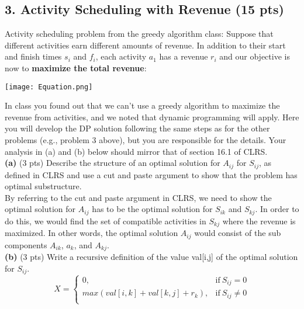 \documentclass[12pt]{article}
\begin{document}
\subsection*{3. Activity Scheduling with Revenue (15 pts)} 
\linebreak
Activity scheduling problem from the greedy algorithm class: Suppose that different activities earn different amounts of revenue. In addition to their start and finish times $s_i$ and $f_i$, each activity $a_1$ has a revenue $r_i$ and our objective is now to \textbf{maximize the total revenue}: \\
\linebreak
\begin{center}
\texttt{[image: Equation.png]} \\
\end{center}
In class you found out that we can't use a greedy algorithm to maximize the revenue from activities, and we noted that dynamic programming will apply. Here you will develop the DP solution following the same steps as for the other problems (e.g., problem 3 above), but you are responsible for the details. Your analysis in (a) and (b) below should mirror that of section 16.1 of CLRS. \\
\linebreak
\textbf{(a)} (3 pts) Describe the structure of an optimal solution for $A_{ij}$ for $S_{ij}$, as defined in CLRS and use a cut and paste argument to show that the problem has optimal substructure. \\
\linebreak
By referring to the cut and paste argument in CLRS, we need to show the optimal solution for $A_{ij}$ has to be the optimal solution for $S_{ik}$ and $S_{kj}$. In order to do this, we would find the set of compatible activities in $S_{kj}$ where the revenue is maximized.  In other words, the optimal solution $A_{ij}$ would consist of the sub components $A_{ik}$, $a_k$, and $A_{kj}$. \\
\linebreak
\textbf{(b)} (3 pts) Write a recursive definition of the value val[i,j] of the optimal solution for $S_{ij}$. \\
\linebreak
  \begin{equation}
    X=
    \begin{cases}
      0, & \text{if}\ S_{ij} = 0 \\
      max(val[i,k] + val[k,j] + r_k), & \text{if}\ S_{ij} \neq 0 \\
    \end{cases}
  \end{equation}
\end{document}
